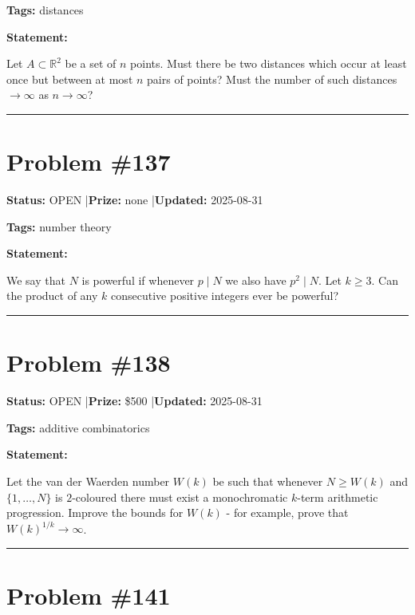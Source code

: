 \documentclass{article}
\begin{document}
\noindent\textbf{Tags:} distances

\medskip

\noindent\textbf{Statement:}

Let $A\subset \mathbb{R}^2$ be a set of $n$ points. Must there be two distances which occur at least once but between at most $n$ pairs of points? Must the number of such distances $\to \infty$ as $n\to \infty$?

\noindent\rule{\linewidth}{0.4pt}


\section{Problem \#137}
\label{prob:137}

\noindent\textbf{Status:} OPEN \quad|\quad \textbf{Prize:} none \quad|\quad \textbf{Updated:} 2025-08-31

\noindent\textbf{Tags:} number theory

\medskip

\noindent\textbf{Statement:}

We say that $N$ is powerful if whenever $p\mid N$ we also have $p^2\mid N$. Let $k\geq 3$. Can the product of any $k$ consecutive positive integers ever be powerful?

\noindent\rule{\linewidth}{0.4pt}


\section{Problem \#138}
\label{prob:138}

\noindent\textbf{Status:} OPEN \quad|\quad \textbf{Prize:} \$500 \quad|\quad \textbf{Updated:} 2025-08-31

\noindent\textbf{Tags:} additive combinatorics

\medskip

\noindent\textbf{Statement:}

Let the van der Waerden number $W(k)$ be such that whenever $N\geq W(k)$ and $\{1,\ldots,N\}$ is $2$-coloured there must exist a monochromatic $k$-term arithmetic progression. Improve the bounds for $W(k)$ - for example, prove that $W(k)^{1/k}\to \infty$.

\noindent\rule{\linewidth}{0.4pt}


\section{Problem \#141}
\label{prob:141}
\end{document}
